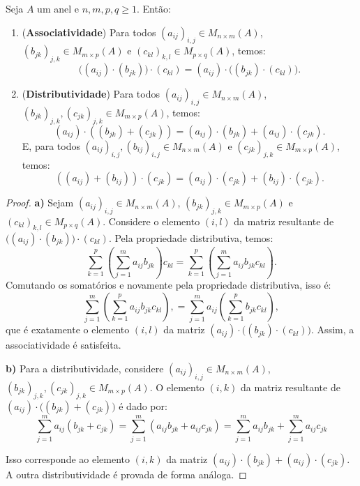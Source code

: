 \begin{prop}
Seja $A$ um anel e $n, m, p, q \geq 1$. Então:
\begin{enumerate}[label=\alph*)]
\item (\textbf{Associatividade}) Para todos $(a_{ij})_{i,j} \in M_{n \times m}(A)$, $(b_{jk})_{j,k} \in M_{m \times p}(A)$ e $(c_{kl})_{k,l} \in M_{p \times q}(A)$, temos:
\[
\big((a_{ij}) \cdot (b_{jk})\big) \cdot (c_{kl}) = (a_{ij}) \cdot \big((b_{jk}) \cdot (c_{kl})\big).
\]

\item (\textbf{Distributividade}) Para todos $(a_{ij})_{i,j} \in M_{n \times m}(A)$, $(b_{jk})_{j,k}, (c_{jk})_{j,k} \in M_{m \times p}(A)$, temos:
\[
(a_{ij}) \cdot\left((b_{jk}) + (c_{jk})\right)
= (a_{ij}) \cdot (b_{jk}) + (a_{ij}) \cdot (c_{jk}).
\]
E, para todos $(a_{ij})_{i,j}, (b_{ij})_{i,j} \in M_{n \times m}(A)$ e $(c_{jk})_{j,k} \in M_{m \times p}(A)$, temos:
\[
\left((a_{ij}) + (b_{ij})\right) \cdot (c_{jk})
= (a_{ij}) \cdot (c_{jk}) + (b_{ij}) \cdot (c_{jk}).
\]
\end{enumerate}
\end{prop}
\begin{proof}
    \textbf{a)} Sejam $(a_{ij})_{i,j} \in M_{n \times m}(A)$, $(b_{jk})_{j,k} \in M_{m \times p}(A)$ e $(c_{kl})_{k,l} \in M_{p \times q}(A)$. Considere o elemento $(i,l)$ da matriz resultante de $\big((a_{ij}) \cdot (b_{jk})\big) \cdot (c_{kl})$.
    Pela propriedade distributiva, temos:
    \[
    \sum_{k=1}^p \left( \sum_{j=1}^m a_{ij} b_{jk} \right) c_{kl}
    =\sum_{k=1}^p \left( \sum_{j=1}^m a_{ij} b_{jk}c_{kl} \right) .
    \]
    Comutando os somatórios e novamente pela propriedade distributiva, isso é:
    \[
    \sum_{j=1}^m\left( \sum_{k=1}^p  a_{ij} b_{jk} c_{kl} \right),
    =\sum_{j=1}^m a_{ij} \left( \sum_{k=1}^p b_{jk} c_{kl} \right),
    \]
    que é exatamente o elemento $(i,l)$ da matriz $(a_{ij}) \cdot \big((b_{jk}) \cdot (c_{kl})\big)$. Assim, a associatividade é satisfeita.

    \textbf{b)} Para a distributividade, considere $(a_{ij})_{i,j} \in M_{n \times m}(A)$, $(b_{jk})_{j,k}, (c_{jk})_{j,k} \in M_{m \times p}(A)$. O elemento $(i,k)$ da matriz resultante de $(a_{ij}) \cdot \big((b_{jk}) + (c_{jk})\big)$ é dado por:
    \[
    \sum_{j=1}^m a_{ij} (b_{jk} + c_{jk})
    =\sum_{j=1}^m (a_{ij}b_{jk} + a_{ij}c_{jk})
    =\sum_{j=1}^m a_{ij}b_{jk} + \sum_{j=1}^ma_{ij}c_{jk}
    \]

    Isso corresponde ao elemento $(i,k)$ da matriz $(a_{ij}) \cdot (b_{jk}) + (a_{ij}) \cdot (c_{jk})$. A outra distributividade é provada de forma análoga.
\end{proof}

